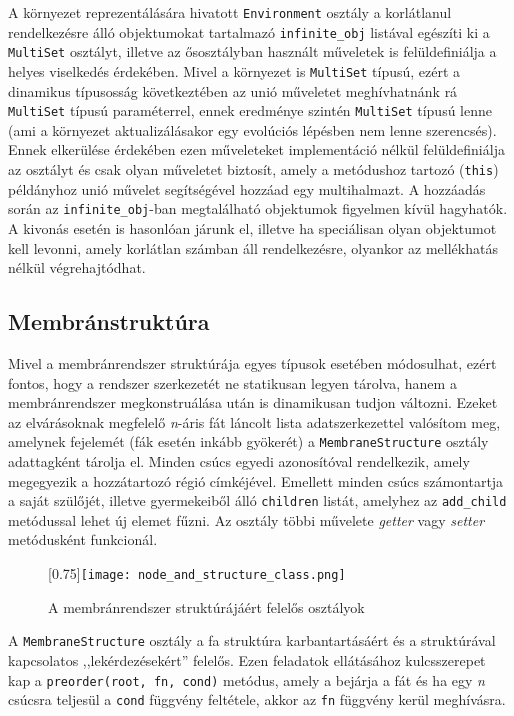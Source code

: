 A környezet reprezentálására hivatott \verb|Environment| osztály a korlátlanul rendelkezésre álló objektumokat tartalmazó \verb|infinite_obj| listával egészíti ki a \verb|MultiSet| osztályt, illetve az ősosztályban használt műveletek is felüldefiniálja a helyes viselkedés érdekében. Mivel a környezet is \verb|MultiSet| típusú, ezért a dinamikus típusosság következtében az unió műveletet meghívhatnánk rá \verb|MultiSet| típusú paraméterrel, ennek eredménye szintén \verb|MultiSet| típusú lenne (ami a környezet aktualizálásakor egy evolúciós lépésben nem lenne szerencsés). Ennek elkerülése érdekében ezen műveleteket implementáció nélkül felüldefiniálja az osztályt és csak olyan műveletet biztosít, amely a metódushoz tartozó (\verb|this|)  példányhoz unió művelet segítségével hozzáad egy multihalmazt. A hozzáadás során az \verb|infinite_obj|-ban megtalálható objektumok figyelmen kívül hagyhatók. A kivonás esetén is hasonlóan járunk el, illetve ha speciálisan olyan objektumot kell levonni, amely korlátlan számban áll rendelkezésre, olyankor az mellékhatás nélkül végrehajtódhat.

\subsection{Membránstruktúra}

Mivel a membránrendszer struktúrája egyes típusok esetében módosulhat, ezért fontos, hogy a rendszer szerkezetét ne statikusan legyen tárolva, hanem a membránrendszer megkonstruálása után is dinamikusan tudjon változni.  Ezeket az elvárásoknak megfelelő \textit{n}-áris fát láncolt lista adatszerkezettel valósítom meg, amelynek fejelemét (fák esetén inkább gyökerét)  a \verb|MembraneStructure| osztály adattagként tárolja el. Minden csúcs egyedi azonosítóval rendelkezik, amely megegyezik a hozzátartozó régió címkéjével. Emellett minden csúcs számontartja a saját szülőjét, illetve gyermekeiből álló \verb|children| listát, amelyhez az \verb|add_child| metódussal lehet új elemet fűzni. Az osztály többi művelete \textit{getter} vagy \textit{setter} metódusként funkcionál.

\begin{figure}[H]
\centering
	\scalebox{0.75}[0.75]{\texttt{[image: node\_and\_structure\_class.png]}}
	\caption{A membránrendszer struktúrájáért felelős osztályok}
	\label{fig:node_and_structure_uml}
\end{figure}


A \verb|MembraneStructure| osztály a fa struktúra karbantartásáért és a struktúrával kapcsolatos ,,lekérdezésekért'' felelős. Ezen feladatok ellátásához kulcsszerepet kap a \verb|preorder(root, fn, cond)| metódus, amely a bejárja a fát és ha egy \textit{n} csúcsra teljesül a \verb|cond| függvény feltétele, akkor az  \verb|fn| függvény kerül meghívásra.

